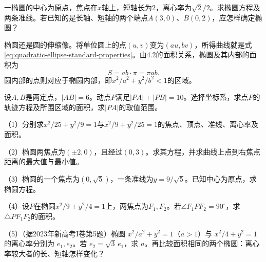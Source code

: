 \begin{samepage}
\begin{example}\label{ex:quadratic-ellipse-determination}
一椭圆的中心为原点，焦点在\(x\)轴上，短轴长为\(2\)，离心率为\(\sqrt2/2\)。求椭圆方程及两条准线。若已知的是长轴、短轴的两个端点\(A(3,0)\)、\(B(0,2)\)，应怎样确定椭圆？
\end{example}
\end{samepage}

椭圆还是圆的伸缩像。将单位圆上的点\((u,v)\)变为\((au,bv)\)，所得曲线就是式\eqref{eq:quadratic-ellipse-standard-properties}。由4.2的面积关系，椭圆及其内部的面积为
\begin{equation}\label{eq:quadratic-ellipse-area}
    S=ab\cdot\pi=\pi ab .
\end{equation}
圆内部的点则对应于椭圆内部，即\(x^2/a^2+y^2/b^2<1\)的区域。

\begin{samepage}
\begin{example}
设\(A,B\)是两定点，\(|AB|=6\)。动点\(P\)满足\(|PA|+|PB|=10\)。选择坐标系，求点\(P\)的轨迹方程及所围区域的面积，求\(|PA|\)的取值范围。
\end{example}
\end{samepage}

\begin{exercise}
\mbox{}\par\nobreak

\begin{samepage}
（1）分别求\(x^2/25+y^2/9=1\)与\(x^2/9+y^2/25=1\)的焦点、顶点、准线、离心率及面积。
\par
\end{samepage}

\begin{samepage}
（2）椭圆两焦点为\((\pm2,0)\)，且经过\((0,3)\)。求其方程，并求曲线上点到右焦点距离的最大值与最小值。
\par
\end{samepage}

\begin{samepage}
（3）椭圆的一个焦点为\((0,\sqrt5)\)，一条准线为\(y=9/\sqrt5\)。已知中心为原点，求椭圆方程。
\par
\end{samepage}

\begin{samepage}
（4）设\(P\)在椭圆\(x^2/9+y^2/4=1\)上，两焦点为\(F_1,F_2\)。若\(\angle F_1PF_2=90^\circ\)，求\(\triangle PF_1F_2\)的面积。
\par
\end{samepage}

\begin{samepage}
（5）（据2023年新高考I卷第5题）椭圆 \(x^2/a^2+y^2=1\)（\(a>1\)）与 \(x^2/4+y^2=1\) 的离心率分别为 \(e_1,e_2\)。若 \(e_2=\sqrt3\,e_1\)，求 \(a\)。再比较面积相同的两个椭圆：离心率较大者的长、短轴怎样变化？
\par
\end{samepage}
\end{exercise}

